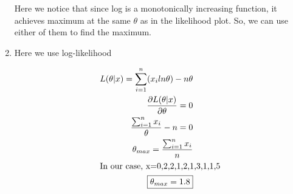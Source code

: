 \documentclass[a4paper]{article}
\begin{document}
\begin{enumerate}
Here we notice that since log is a monotonically increasing function, it achieves maximum at the same $\theta$ as in the likelihood plot. So, we can use either of them to find the maximum.

\item Here we use log-likelihood

\begin{align*}
	L(\theta|x) = \sum_{i=1}^{n} (x_{i} ln\theta) - n\theta \\
	\frac{\partial L(\theta | x)}{\partial \theta} = 0 \\ \newline
	\frac{\sum_{i=1}^{n}x_{i}}{\theta} - n  = 0 \\
	\theta_{max}  =  \frac{\sum_{i=1}^{n}x_{i}}{n} \\
	\intertext{In our case, x=0,2,2,1,2,1,3,1,1,5}
	\boxed{\theta_{max}  =  1.8}
\end{align*}
\end{enumerate}
\end{document}
